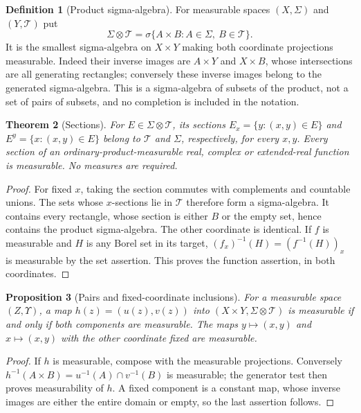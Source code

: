 \documentclass[11pt,oneside,openany]{book}
\newtheorem{theorem}{Theorem}[chapter]
\newtheorem{proposition}[theorem]{Proposition}
\theoremstyle{definition}
\newtheorem{definition}[theorem]{Definition}
\theoremstyle{remark}
\newcommand{\family}[1]{}
\begin{document}
\begin{definition}[Product sigma-algebra]
\family{D11.08.product_sigma}\label{d11:08:product-sigma}
For measurable spaces $(X,\Sigma)$ and $(Y,\mathcal T)$ put
\[
 \Sigma\otimes\mathcal T
 =\sigma\{A\times B:A\in\Sigma,\ B\in\mathcal T\}.
\]
It is the smallest sigma-algebra on $X\times Y$ making both coordinate
projections measurable. Indeed their inverse images are $A\times Y$ and
$X\times B$, whose intersections are all generating rectangles; conversely
these inverse images belong to the generated sigma-algebra. This is a
sigma-algebra of subsets of the product, not a set of pairs of subsets,
and no completion is included in the notation.
\end{definition}

\begin{theorem}[Sections]
\family{D11.08.sections}\label{d11:08:sections}
For $E\in\Sigma\otimes\mathcal T$, its sections
$E_x=\{y:(x,y)\in E\}$ and $E^y=\{x:(x,y)\in E\}$ belong to
$\mathcal T$ and $\Sigma$, respectively, for every $x,y$.
Every section of an ordinary-product-measurable real, complex or
extended-real function is measurable. No measures are required.
\end{theorem}
\begin{proof}
For fixed $x$, taking the section commutes with complements and countable
unions. The sets whose $x$-sections lie in $\mathcal T$ therefore form a
sigma-algebra. It contains every rectangle, whose section is either $B$
or the empty set, hence contains the product sigma-algebra. The other
coordinate is identical. If $f$ is measurable and $H$ is any Borel set
in its target, $(f_x)^{-1}(H)=(f^{-1}(H))_x$ is measurable by the set
assertion. This proves the function assertion, in both coordinates.
\end{proof}

\begin{proposition}[Pairs and fixed-coordinate inclusions]
\family{D11.08.measurable_pair}\label{d11:08:measurable-pair}
For a measurable space $(Z,\Upsilon)$, a map
$h(z)=(u(z),v(z))$ into $(X\times Y,\Sigma\otimes\mathcal T)$ is
measurable if and only if both components are measurable. The maps
$y\mapsto(x,y)$ and $x\mapsto(x,y)$ with the other coordinate fixed are
measurable.
\end{proposition}
\begin{proof}
If $h$ is measurable, compose with the measurable projections. Conversely
$h^{-1}(A\times B)=u^{-1}(A)\cap v^{-1}(B)$ is measurable; the generator
test then proves measurability of $h$. A fixed component is a constant
map, whose inverse images are either the entire domain or empty, so the
last assertion follows.
\end{proof}
\end{document}
